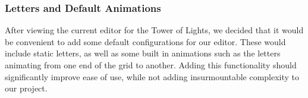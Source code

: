 \documentclass[letterpaper,12pt]{article}
\begin{document}
	\subsubsection*{Letters and Default Animations}
After viewing the current editor for the Tower of Lights, we decided that it would be convenient to add some default configurations for our editor. These would include static letters, as well as some built in animations such as the letters animating from one end of the grid to another. Adding this functionality should significantly improve ease of use, while not adding insurmountable complexity to our project. 
		
	
	
\end{document}
